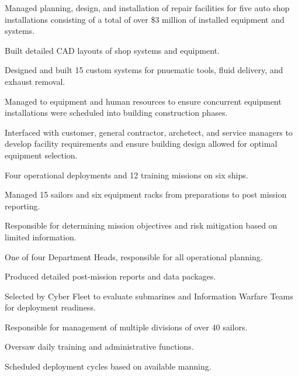 \begin{tightemize}
\item Managed planning, design, and installation of repair facilities for five auto shop installations consisting of a total of over \$3 million of installed equipment and systems.
\item Built detailed CAD layouts of shop systems and equipment.
\item Designed and built 15 custom systems for pnuematic tools, fluid delivery, and exhaust removal.
\item Managed to equipment and human resources to ensure concurrent equipment installations were scheduled into building construction phases.
\item Interfaced with customer, general contractor, archetect, and service managers to develop facility requirements and ensure building design allowed for optimal equipment selection.
\end{tightemize}
\sectionsep

\begin{tightemize}
\item Four operational deployments and 12 training missions on six ships.
\item Managed 15 sailors and six equipment racks from preparations to post mission reporting.
\item Responsible for determining mission objectives and risk mitigation based on limited information.
\item One of four Department Heads, responsible for all operational planning.
\item Produced detailed post-mission reports and data packages.
\item Selected by Cyber Fleet to evaluate submarines and Information Warfare Teams for deployment readiness. 
\end{tightemize}
\sectionsep

\begin{tightemize}
\item Responsible for management of multiple divisions of over 40 sailors.
\item Oversaw daily training and administrative functions.
\item Scheduled deployment cycles based on available manning.
\end{tightemize}
\sectionsep

